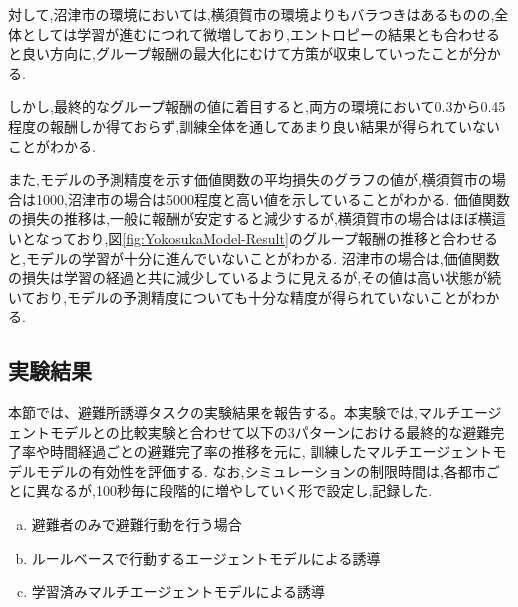 対して,沼津市の環境においては,横須賀市の環境よりもバラつきはあるものの,全体としては学習が進むにつれて微増しており,エントロピーの結果とも合わせると良い方向に,グループ報酬の最大化にむけて方策が収束していったことが分かる.\par
しかし,最終的なグループ報酬の値に着目すると,両方の環境において0.3から0.45程度の報酬しか得ておらず,訓練全体を通してあまり良い結果が得られていないことがわかる.\par
また,モデルの予測精度を示す価値関数の平均損失のグラフの値が,横須賀市の場合は1000,沼津市の場合は5000程度と高い値を示していることがわかる.
価値関数の損失の推移は,一般に報酬が安定すると減少するが,横須賀市の場合はほぼ横這いとなっており,図\ref{fig:YokosukaModel-Result}のグループ報酬の推移と合わせると,モデルの学習が十分に進んでいないことがわかる.
沼津市の場合は,価値関数の損失は学習の経過と共に減少しているように見えるが,その値は高い状態が続いており,モデルの予測精度についても十分な精度が得られていないことがわかる.\par
\subsection{実験結果}
本節では、避難所誘導タスクの実験結果を報告する。本実験では,マルチエージェントモデルとの比較実験と合わせて以下の3パターンにおける最終的な避難完了率や時間経過ごとの避難完了率の推移を元に,
訓練したマルチエージェントモデルモデルの有効性を評価する.
なお,シミュレーションの制限時間は,各都市ごとに異なるが,100秒毎に段階的に増やしていく形で設定し,記録した.
\begin{enumerate}[(a)]
  \item 避難者のみで避難行動を行う場合
  \item ルールベースで行動するエージェントモデルによる誘導
  \item 学習済みマルチエージェントモデルによる誘導
\end{enumerate}
